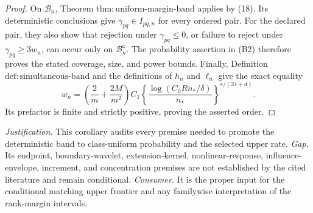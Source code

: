 \documentclass{article}
\begin{document}
\begin{proof}
On \(\mathcal B_n\), Theorem \(\mathrm{thm:uniform\text{-}margin\text{-}band}\) applies by (18).  Its deterministic conclusions give \(\gamma_{pq}\in I_{pq,n}\) for every ordered pair.  For the declared pair, they also show that rejection under \(\gamma_{pq}\le0\), or failure to reject under \(\gamma_{pq}\ge3w_n\), can occur only on \(\mathcal B_n^{\mathsf c}\).  The probability assertion in (B2) therefore proves the stated coverage, size, and power bounds.  Finally, Definition \(\mathrm{def:simultaneous\text{-}band}\) and the definitions of \(h_n\) and \(\ell_n\) give the exact equality
\[
 w_n=\left(\frac2m+\frac{2M}{m^2}\right)C_1
 \left\{\frac{\log(C_0Rn_\ast/\delta)}{n_\ast}\right\}^{s/(2s+d)}.
\]
Its prefactor is finite and strictly positive, proving the asserted order.
\end{proof}
\par\smallskip\noindent \textit{Justification.} This corollary audits every premise needed to promote the deterministic band to class-uniform probability and the selected upper rate. \textit{Gap.} Its endpoint, boundary-wavelet, extension-kernel, nonlinear-response, influence-envelope, increment, and concentration premises are not established by the cited literature and remain conditional. \textit{Consumer.} It is the proper input for the conditional matching upper frontier and any familywise interpretation of the rank-margin intervals.
\end{document}
